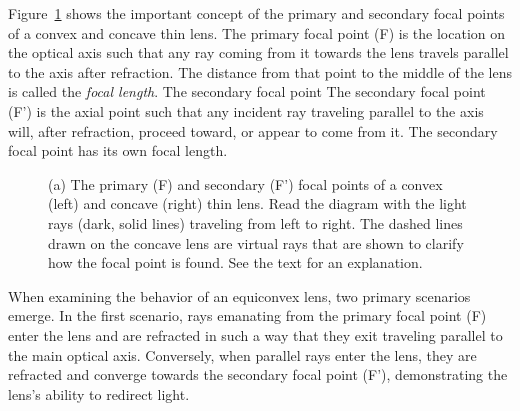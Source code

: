 \documentclass[
  letterpaper,
]{book}
\begin{document}
Figure~\ref{fig-thinlens-focalpoints} shows the important concept of the
primary and secondary focal points of a convex and concave thin lens.
The primary focal point (F) is the location on the optical axis such
that any ray coming from it towards the lens travels parallel to the
axis after refraction. The distance from that point to the middle of the
lens is called the \emph{focal length}. The secondary focal point The
secondary focal point (F') is the axial point such that any incident ray
traveling parallel to the axis will, after refraction, proceed toward,
or appear to come from it. The secondary focal point has its own focal
length.

\begin{figure}


\caption{\label{fig-thinlens-focalpoints}(a) The primary (F) and
secondary (F') focal points of a convex (left) and concave (right) thin
lens. Read the diagram with the light rays (dark, solid lines) traveling
from left to right. The dashed lines drawn on the concave lens are
virtual rays that are shown to clarify how the focal point is found. See
the text for an explanation.}

\end{figure}%

When examining the behavior of an equiconvex lens, two primary scenarios
emerge. In the first scenario, rays emanating from the primary focal
point (F) enter the lens and are refracted in such a way that they exit
traveling parallel to the main optical axis. Conversely, when parallel
rays enter the lens, they are refracted and converge towards the
secondary focal point (F'), demonstrating the lens's ability to redirect
light.
\end{document}
